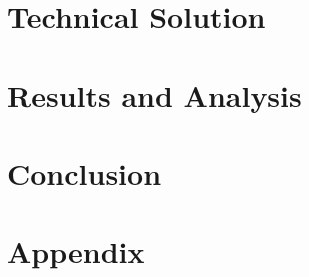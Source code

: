 \documentclass{report}
\begin{document}
\chapter{Technical Solution}

\newpage

\chapter{Results and Analysis}
\newpage

\chapter{Conclusion}
\newpage



\newpage

\chapter{Appendix}

\newpage
\end{document}

